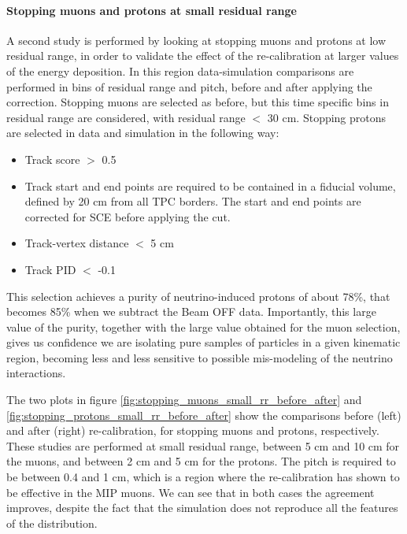\paragraph{Stopping muons and protons at small residual range}
A second study is performed by looking at stopping muons and protons at low residual range, in order to validate the effect of the re-calibration at larger values of the energy deposition.
In this region data-simulation comparisons are performed in bins of residual range and pitch, before and after applying the correction.
Stopping muons are selected as before, but this time specific bins in residual range are considered, with residual range $<$ 30 cm. 
Stopping protons are selected in data and simulation in the following way:


\begin{itemize}
    \item Track score $>$ 0.5
    \item Track start and end points are required to be contained in a fiducial volume, defined by 20 cm from all TPC borders. The start and end points are corrected for SCE before applying the cut.
    \item Track-vertex distance $<$ 5 cm
    \item Track PID $<$ -0.1
\end{itemize}
This selection achieves a purity of neutrino-induced protons of about 78\%, that becomes 85\% when we subtract the Beam OFF data.
Importantly, this large value of the purity, together with the large value obtained for the muon selection, gives us confidence we are isolating pure samples of particles in a given kinematic region, becoming less and less sensitive to possible mis-modeling of the neutrino interactions.

The two plots in figure \ref{fig:stopping_muons_small_rr_before_after} and \ref{fig:stopping_protons_small_rr_before_after} show the comparisons before (left) and after (right) re-calibration, for stopping muons and protons, respectively.
These studies are performed at small residual range, between 5 cm and 10 cm for the muons, and between 2 cm and 5 cm for the protons.
The pitch is required to be between 0.4 and 1 cm, which is a region where the re-calibration has shown to be effective in the MIP muons.
We can see that in both cases the agreement improves, despite the fact that the simulation does not reproduce all the features of the distribution.

